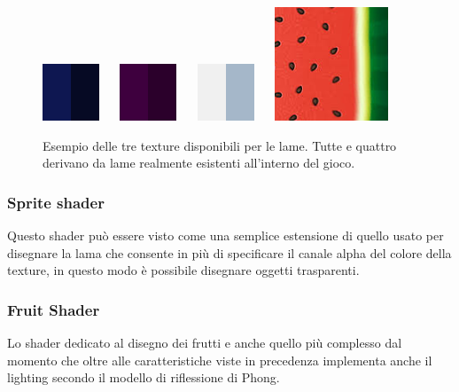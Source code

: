 \begin{figure}[!htp]
	\centering
	\includegraphics[width=0.2\linewidth]{images/ch20/blade0}
	$\quad$
	\includegraphics[width=0.2\linewidth]{images/ch20/blade1}
	$\quad$
	\includegraphics[width=0.2\linewidth]{images/ch20/blade2}
	$\quad$
	\includegraphics[width=0.2\linewidth]{images/ch20/blade3}
	\caption{Esempio delle tre texture disponibili per le lame. Tutte e quattro derivano da lame realmente esistenti all'interno del gioco.}
	\label{fig:blades}
\end{figure}


\subsubsection{Sprite shader}
Questo shader può essere visto come una semplice estensione di quello usato per disegnare la lama che consente in più di specificare il canale alpha del colore della texture, in questo modo è possibile disegnare oggetti trasparenti.


\subsubsection{Fruit Shader}
Lo shader dedicato al disegno dei frutti e anche quello più complesso dal momento che oltre alle caratteristiche viste in precedenza implementa anche il lighting secondo il modello di riflessione di Phong.


